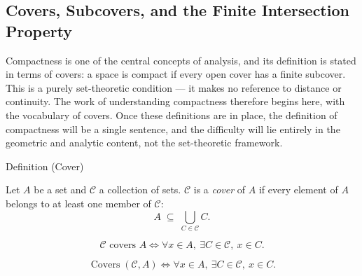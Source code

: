 
\subsection{Covers, Subcovers, and the Finite Intersection Property}


\begin{exposition}
Compactness is one of the central concepts of analysis, and its definition is
stated in terms of covers: a space is compact if every open cover has a finite
subcover. This is a purely set-theoretic condition --- it makes no reference to
distance or continuity. The work of understanding compactness therefore begins
here, with the vocabulary of covers. Once these definitions are in place, the
definition of compactness will be a single sentence, and the difficulty will
lie entirely in the geometric and analytic content, not the set-theoretic
framework.
\end{exposition}


\begin{definitionbox}{Definition (Cover)}
\begin{definition}[Cover]\label{def:cover-full}
Let $A$ be a set and $\mathcal{C}$ a collection of sets.
$\mathcal{C}$ is a \emph{cover} of $A$ if every element of $A$ belongs to
at least one member of $\mathcal{C}$:
\[
A \;\subseteq\; \bigcup_{C \in \mathcal{C}} C.
\]
\end{definition}
\end{definitionbox}

\begin{remark*}
\[
  \mathcal{C}\text{ covers }A
  \iff
  \forall x\in A,\ \exists C\in\mathcal{C},\ x\in C.
\]
\end{remark*}

\begin{remark*}
\[
  \operatorname{Covers}(\mathcal{C},A)
  \iff
  \forall x\in A,\ \exists C\in\mathcal{C},\ x\in C.
\]
\end{remark*}

